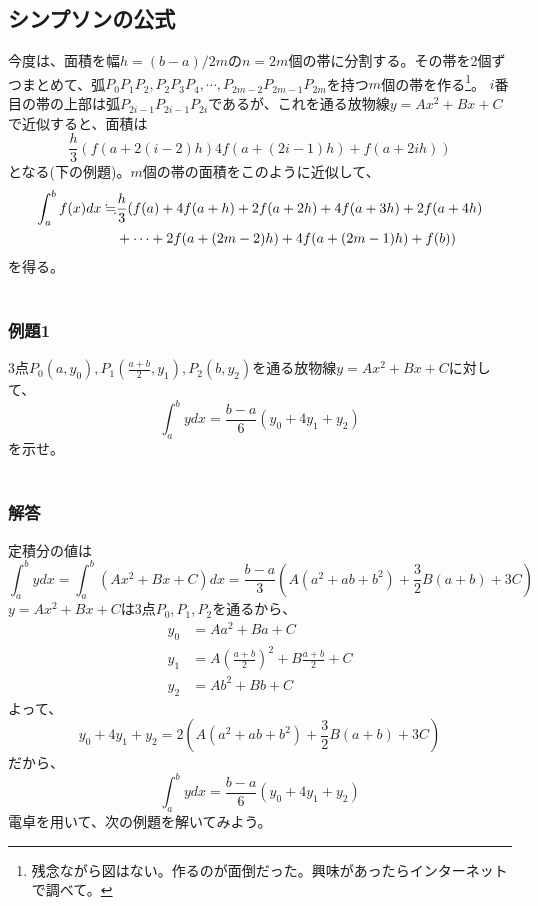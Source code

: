 \documentclass[a4j,dvipdfmx]{jsarticle}
\begin{document}
\subsection{シンプソンの公式}
今度は、面積を幅$h=(b-a)/2m$の$n=2m$個の帯に分割する。その帯を2個ずつまとめて、弧$P_0P_1P_2,P_2P_3P_4,\cdots,P_{2m-2}P_{2m-1}P_{2m}$を持つ$m$個の帯を作る\footnote{残念ながら図はない。作るのが面倒だった。興味があったらインターネットで調べて。}。
$i$番目の帯の上部は弧$P_{2i-1}P_{2i-1}P_{2i}$であるが、これを通る放物線$y=Ax^2+Bx+C$で近似すると、面積は
\begin{equation}
    \frac{h}{3}(f(a+2(i-2)h)4f(a+(2i-1)h)+f(a+2ih))
\end{equation}
となる(下の例題)。$m$個の帯の面積をこのように近似して、
\begin{align}
    \label{simpson}
    \int_a^b f(x)dx\fallingdotseq &\frac{h}{3}(f(a)+4f(a+h)+2f(a+2h)+4f(a+3h)+2f(a+4h)\notag\\
    &+\cdots+2f(a+(2m-2)h)+4f(a+(2m-1)h)+f(b))
\end{align}
を得る。\\\\
\subsubsection*{例題1}
3点$P_0(a,y_0),P_1(\frac{a+b}{2},y_1),P_2(b,y_2)$を通る放物線$y=Ax^2+Bx+C$に対して、
\begin{equation*}
    \int_a^b ydx=\frac{b-a}{6}(y_0+4y_1+y_2)
\end{equation*}
を示せ。\\\\
\subsubsection*{解答}
定積分の値は
\begin{equation*}
    \int_a^b ydx=\int_a^b(Ax^2+Bx+C)dx=\frac{b-a}{3}(A(a^2+ab+b^2)+\frac{3}{2}B(a+b)+3C)
\end{equation*}
$y=Ax^2+Bx+C$は3点$P_0,P_1,P_2$を通るから、
\begin{align*}
    y_0&=Aa^2+Ba+C\\
    y_1&=A(\frac{a+b}{2})^2+B\frac{a+b}{2}+C\\
    y_2&=Ab^2+Bb+C
\end{align*}
よって、
\begin{equation*}
    y_0+4y_1+y_2=2(A(a^2+ab+b^2)+\frac{3}{2}B(a+b)+3C)
\end{equation*}
だから、
\begin{equation*}
    \int_a^b ydx=\frac{b-a}{6}(y_0+4y_1+y_2)
\end{equation*}
\newpage
電卓を用いて、次の例題を解いてみよう。
\end{document}
